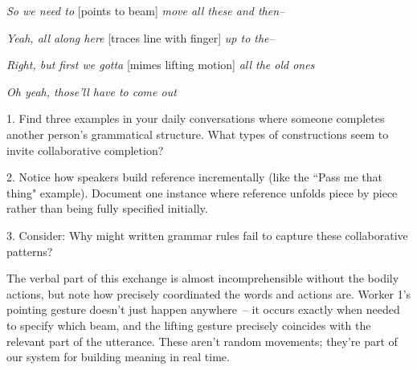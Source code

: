 \ea
\begin{dialogue}
\item[Worker 1] \textit{So we need to }[points to beam]\textit{ move all these and then--} 
\item[Worker 2] \textit{Yeah, all along here }[traces line with finger]\textit{ up to the--}
\item[Worker 1] \textit{Right, but first we gotta }[mimes lifting motion]\textit{ all the old ones}
\item[Worker 2] \textit{Oh yeah, those'll have to come out}
\end{dialogue}
\z

\begin{tcolorbox}[title=Exercise: Grammar as Real-Time Resource, colback=white, colframe=green!75!black, fonttitle=\bfseries]
1. Find three examples in your daily conversations where someone completes another person's grammatical structure. What types of constructions seem to invite collaborative completion?

2. Notice how speakers build reference incrementally (like the ``Pass me that thing" example). Document one instance where reference unfolds piece by piece rather than being fully specified initially.

3. Consider: Why might written grammar rules fail to capture these collaborative patterns?
\end{tcolorbox}

\noindent The verbal part of this exchange is almost incomprehensible without the bodily actions, but note how precisely coordinated the words and actions are. Worker 1's pointing gesture doesn't just happen anywhere~-- it occurs exactly when needed to specify which beam, and the lifting gesture precisely coincides with the relevant part of the utterance. These aren't random movements; they're part of our system for building meaning in real time.

